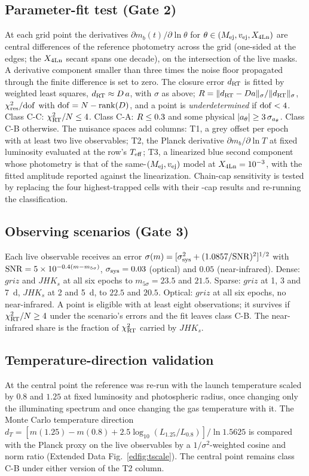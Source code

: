 \documentclass[11pt]{article}
\newcommand{\dRT}{d_{\rm RT}}
\newcommand{\Xlan}{X_{\rm 4Ln}}
\newcommand{\Mej}{M_{\rm ej}}
\newcommand{\vej}{v_{\rm ej}}
\newcommand{\Teff}{T_{\rm eff}}
\newcommand{\chires}{\chi^2_{\rm res}/{\rm dof}}
\newcommand{\sigsys}{\sigma_{\rm sys}}
\begin{document}
\subsection*{Parameter-fit test (Gate 2)}
At each grid point the derivatives $\partial m_b(t)/\partial\ln\theta$ for $\theta\in(\Mej,\vej,\Xlan)$ are central differences of the reference photometry across the grid (one-sided at the edges; the $\Xlan$ secant spans one decade), on the intersection of the live masks. A derivative component smaller than three times the noise floor propagated through the finite difference is set to zero. The closure error $\dRT$ is fitted by weighted least squares, $\dRT\approx D\,a$, with $\sigma$ as above; $R=\|\dRT-Da\|_\sigma/\|\dRT\|_\sigma$, $\chires$ with ${\rm dof}=N-{\rm rank}(D)$, and a point is \emph{underdetermined} if ${\rm dof}<4$. Class C-C: $\chi^2_{\rm RT}/N\le4$. Class C-A: $R\le0.3$ and some physical $|a_\theta|\ge3\,\sigma_{a_\theta}$. Class C-B otherwise. The nuisance spaces add columns: T1, a grey offset per epoch with at least two live observables; T2, the Planck derivative $\partial m_b/\partial\ln T$ at fixed luminosity evaluated at the row's $\Teff$; T3, a linearized blue second component whose photometry is that of the same-$(\Mej,\vej)$ model at $\Xlan=10^{-3}$, with the fitted amplitude reported against the linearization. Chain-cap sensitivity is tested by replacing the four highest-trapped cells with their \ChainTop-cap results and re-running the classification.

\subsection*{Observing scenarios (Gate 3)}
Each live observable receives an error $\sigma(m)=[\sigsys^2+(1.0857/{\rm SNR})^2]^{1/2}$ with ${\rm SNR}=5\times10^{-0.4(m-m_{5\sigma})}$, $\sigsys=0.03$ (optical) and $0.05$ (near-infrared). Dense: $griz$ and $JHK_s$ at all six epochs to $m_{5\sigma}=23.5$ and $21.5$. Sparse: $griz$ at 1, 3 and 7~d, $JHK_s$ at 2 and 5~d, to $22.5$ and $20.5$. Optical: $griz$ at all six epochs, no near-infrared. A point is eligible with at least eight observations; it survives if $\chi^2_{\rm RT}/N\ge4$ under the scenario's errors and the fit leaves class C-B. The near-infrared share is the fraction of $\chi^2_{\rm RT}$ carried by $JHK_s$.

\subsection*{Temperature-direction validation}
At the central point the reference was re-run with the launch temperature scaled by $0.8$ and $1.25$ at fixed luminosity and photospheric radius, once changing only the illuminating spectrum and once changing the gas temperature with it. The Monte Carlo temperature direction $d_T=[m(1.25)-m(0.8)+2.5\log_{10}(L_{1.25}/L_{0.8})]/\ln1.5625$ is compared with the Planck proxy on the live observables by a $1/\sigma^2$-weighted cosine and norm ratio (Extended Data Fig.~\ref{edfig:tscale}). The central point remains class C-B under either version of the T2 column.
\end{document}
